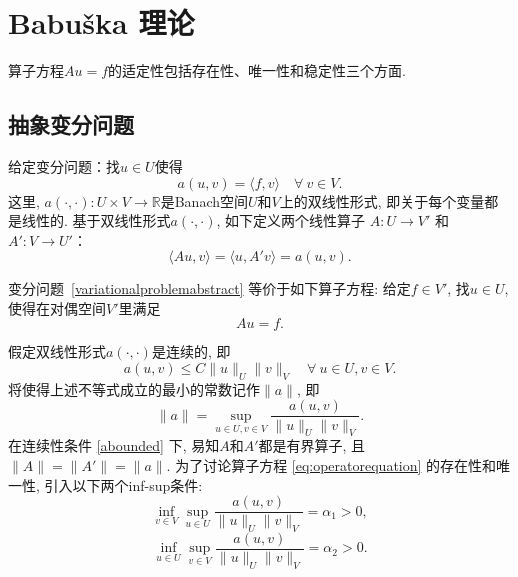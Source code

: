 

\section{Babu\v{s}ka 理论}

算子方程$Au = f$的适定性包括存在性、唯一性和稳定性三个方面.


\subsection{抽象变分问题}

给定变分问题：找$u\in U$使得
\begin{equation}\label{variationalproblemabstract}
a(u, v) = \langle f, v\rangle\quad\forall~v\in V.
\end{equation}
这里, 
$
a(\cdot, \cdot): U\times V\to\mathbb R
$是Banach空间$U$和$V$上的双线性形式, 即关于每个变量都是线性的.
基于双线性形式$a(\cdot, \cdot)$, 如下定义两个线性算子
$A: U\to V'$ 和 $A': V\to U'$：
\[
\langle Au, v\rangle=\langle u, A'v\rangle=a(u, v).
\]

变分问题~\eqref{variationalproblemabstract} 等价于如下算子方程: 给定$f\in V'$, 找$u\in U$, 使得在对偶空间$V'$里满足
\begin{equation}\label{eq:operatorequation}
 Au = f .
\end{equation}

假定双线性形式$a(\cdot, \cdot)$是连续的, 即
\begin{equation}\label{abounded}
a(u, v) \leq  C\|u\|_U\|v\|_V\quad \forall~u\in U,  v\in V.
\end{equation}
将使得上述不等式成立的最小的常数记作$\|a\|$, 即
$$
\|a\|=\sup_{u\in U, v\in V}\frac{a(u, v)}{\|u\|_U\|v\|_V}.
$$
在连续性条件 \eqref{abounded} 下, 易知$A$和$A'$都是有界算子, 且$\|A\| = \|A'\| = \|a\|$.
为了讨论算子方程 \eqref{eq:operatorequation} 的存在性和唯一性, 引入以下两个inf-sup条件:
\begin{equation}\label{infsup1}
\inf_{v\in V}\sup_{u\in U}\frac{a(u, v)}{\|u\|_U\|v\|_V}=\alpha_1>0,
\end{equation}
\begin{equation}\label{infsup2}
\inf_{u\in U}\sup_{v\in V}\frac{a(u, v)}{\|u\|_U\|v\|_V}=\alpha_2>0.
\end{equation}

